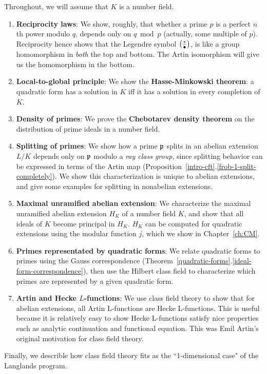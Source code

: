 Throughout, we will assume that $K$ is a number field.
\begin{enumerate}
\item \textbf{Reciprocity laws}: We show, roughly, that whether a prime $p$ is a perfect $n$th power modulo $q$, depends {only} on $q\bmod p$ (actually, some multiple of $p$). Reciprocity hence shows that the Legendre symbol $\left( {\frac{*}{\bullet}} \right)$, is like a group homomorphism in {\it both} the top and bottom. The Artin isomorphism will give us the homomorphism in the bottom.
\item \textbf{Local-to-global principle}: We show the \textbf{Hasse-Minkowski theorem}: a quadratic form has a solution in $K$ iff it has a solution in every completion of $K$.
\item \textbf{Density of primes}: We prove the \textbf{Chebotarev density theorem} on the distribution of prime ideals in a number field.
\item \textbf{Splitting of primes}: We show how a prime $\mathfrak{p}$ splits in an abelian extension $L/K$ depends only on $\mathfrak{p}$ modulo a {\it ray class group}, since splitting behavior can be expressed in terms of the Artin map (Proposition~\ref{intro-cft}.\ref{frob-1-split-completely}). We show this characterization is unique to abelian extensions, and give some examples for splitting in nonabelian extensions.
\item \textbf{Maximal unramified abelian extension}: We characterize the maximal unramified abelian extension $H_K$ of a number field $K$, and show that all ideals of $K$ become principal in $H_K$. $H_K$ can be computed for quadratic extensions using the modular function $j$, which we show in Chapter~\ref{ch:CM}.
\item \textbf{Primes representated by quadratic forms}: We relate quadratic forms to primes using the Gauss correspondence (Theorem~\ref{quadratic-forms}.\ref{ideal-form-correspondence}), then use the Hilbert class field to characterize which primes are represented by a given quadratic form.
\item \textbf{Artin and Hecke $L$-functions}: We use class field theory to show that for abelian extensions, all Artin L-functions are Hecke L-functions. This is useful because it is relatively easy to show Hecke L-functions satisfy nice properties such as analytic continuation and functional equation. 
This was Emil Artin's original motivation for class field theory.
\end{enumerate}
Finally, we describle how class field theory fits as the ``1-dimensional case" of the Langlands program.
